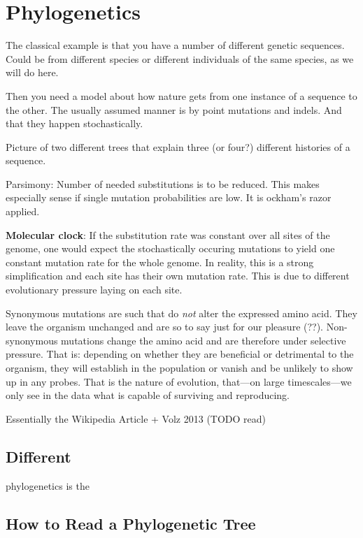 \documentclass[12pt]{scrartcl}
\begin{document}
\section{Phylogenetics}

  The classical example is that you have a number of different genetic sequences. Could be from different species or different individuals of the same species, as we will do here.

  Then you need a model about how nature gets from one instance of a sequence to the other. The usually assumed manner is by point mutations and indels. And that they happen stochastically.

  Picture of two different trees that explain three (or four?) different histories of a sequence.

  Parsimony: Number of needed substitutions is to be reduced. This makes especially sense if single mutation probabilities are low. It is ockham's razor applied.

  \textbf{Molecular clock}: If the substitution rate was constant over all sites of the genome, one would expect the stochastically occuring mutations to yield one constant mutation rate for the whole genome. In reality, this is a strong simplification and each site has their own mutation rate. This is due to different evolutionary pressure laying on each site.

  Synonymous mutations are such that do \textit{not} alter the expressed amino acid. They leave the organism unchanged and are so to say just for our pleasure (??). Non-synonymous mutations change the amino acid and are therefore under selective pressure. That is: depending on whether they are beneficial or detrimental to the organism, they will establish in the population or vanish and be unlikely to show up in any probes. That is the nature of evolution, that---on large timescales---we only see in the data what is capable of surviving and reproducing.

  Essentially the Wikipedia Article + Volz 2013 (TODO read)

  \subsection{Different }

  \Gls{phylogenetics} is the

  \subsection{How to Read a Phylogenetic Tree}
\end{document}
